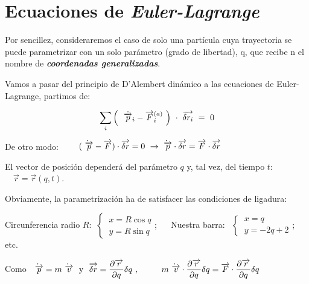 \vspace{1cm}
\section{Ecuaciones de \emph{Euler-Lagrange}}
\vspace{0.5cm}

Por sencillez, consideraremos el caso de solo una partícula cuya trayectoria se puede parametrizar con un solo parámetro (grado de libertad), q, que recibe n el nombre de \textbf{\emph{coordenadas generalizadas}}.

Vamos a pasar del principio de D'Alembert dinámico a las ecuaciones de Euler-Lagrange, partimos de:

$$\displaystyle \sum_i \left ( \ \dot{\ \overrightarrow p_i} - \overrightarrow F^{(a)}_i \ \right) \ \cdot \ \overrightarrow{\var r_i} \ = \ 0$$

De otro modo: $\qquad   (\dot{\ \overrightarrow p} - \overrightarrow F)\cdot \overrightarrow {\var r} = 0 \ \to \dot{\ \overrightarrow p}\cdot \overrightarrow{\var r} = \overrightarrow F \cdot \overrightarrow{\var r}$

El vector de posición dependerá del parámetro $q$ y, tal vez, del tiempo $t$: $\quad \overrightarrow r= \overrightarrow r (q,t)$.

\begin{small}
\textcolor{gris}{Obviamente, la parametrización ha de satisfacer las condiciones de ligadura:}

\textcolor{gris}{Circunferencia radio $R$: $\ \begin{cases} \ x=R \cos q \\ \ y=R \sin q \end{cases}$; $\quad$ Nuestra barra: $\ \ \begin{cases} \ x=q \\ \ y=-2q+2 \end{cases}$; $\quad$ etc.}
\end{small}


Como $\ \dot{\ \overrightarrow p}=m\dot{\ \overrightarrow v} \ \text{ y }  \ \displaystyle \overrightarrow{ \var r} = \pdv{\overrightarrow r}{q} \var q \ , \ \  \qquad m \dot{\ \overrightarrow v} \cdot \pdv{\overrightarrow r}{q} \var q = \overrightarrow F \cdot \pdv{\overrightarrow r}{q} \var q $

